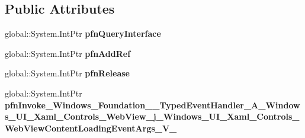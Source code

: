 \subsection*{Public Attributes}
\begin{DoxyCompactItemize}
\item 
\mbox{\label{struct_windows_1_1_foundation_1_1_typed_event_handler___a___windows___u_i___xaml___controls___we27d953ba581e9b4ad25b4f27fbd2d234_aca27a532f1dbb38b5a452d678e23fc86}} 
global\+::\+System.\+Int\+Ptr {\bfseries pfn\+Query\+Interface}
\item 
\mbox{\label{struct_windows_1_1_foundation_1_1_typed_event_handler___a___windows___u_i___xaml___controls___we27d953ba581e9b4ad25b4f27fbd2d234_a72fda7f06f28a461670693cbf2045037}} 
global\+::\+System.\+Int\+Ptr {\bfseries pfn\+Add\+Ref}
\item 
\mbox{\label{struct_windows_1_1_foundation_1_1_typed_event_handler___a___windows___u_i___xaml___controls___we27d953ba581e9b4ad25b4f27fbd2d234_ac8753be171c3c8231ca831ee87639123}} 
global\+::\+System.\+Int\+Ptr {\bfseries pfn\+Release}
\item 
\mbox{\label{struct_windows_1_1_foundation_1_1_typed_event_handler___a___windows___u_i___xaml___controls___we27d953ba581e9b4ad25b4f27fbd2d234_a4fc6344f088cc51285e53096d6facd37}} 
global\+::\+System.\+Int\+Ptr {\bfseries pfn\+Invoke\+\_\+\+Windows\+\_\+\+Foundation\+\_\+\+\_\+\+Typed\+Event\+Handler\+\_\+\+A\+\_\+\+Windows\+\_\+\+U\+I\+\_\+\+Xaml\+\_\+\+Controls\+\_\+\+Web\+View\+\_\+j\+\_\+\+Windows\+\_\+\+U\+I\+\_\+\+Xaml\+\_\+\+Controls\+\_\+\+Web\+View\+Content\+Loading\+Event\+Args\+\_\+\+V\+\_\+}
\end{DoxyCompactItemize}
